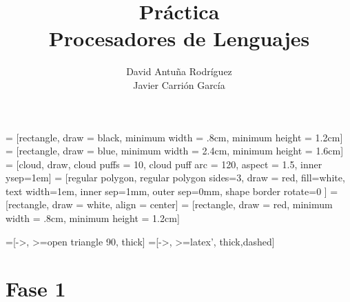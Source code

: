 \documentclass[11pt]{article}
\title{Práctica\\\Large Procesadores de Lenguajes}
\author{David Antuña Rodríguez\\Javier Carrión García}
\date{}
\begin{document}
  = [rectangle, draw = black, minimum width = .8cm, minimum height = 1.2cm]
  = [rectangle, draw = blue, minimum width = 2.4cm, minimum height = 1.6cm]
   = [cloud, draw, cloud puffs = 10, cloud puff arc = 120, aspect = 1.5, inner ysep=1em]
   = [regular polygon, regular polygon sides=3, draw = red, fill=white, text width=1em, inner sep=1mm, outer sep=0mm, shape border rotate=0 ]
  = [rectangle, draw = white, align = center]
  = [rectangle, draw = red, minimum width = .8cm, minimum height = 1.2cm]

  =[->, >=open triangle 90, thick]
  =[->, >=latex', thick,dashed]

  \raggedright
  \maketitle
  \newpage
  \tableofcontents
  \newpage

  \section{Fase 1}
  {
    \let\section\subsection
    \let\subsection\subsubsection
    
  }
\end{document}

